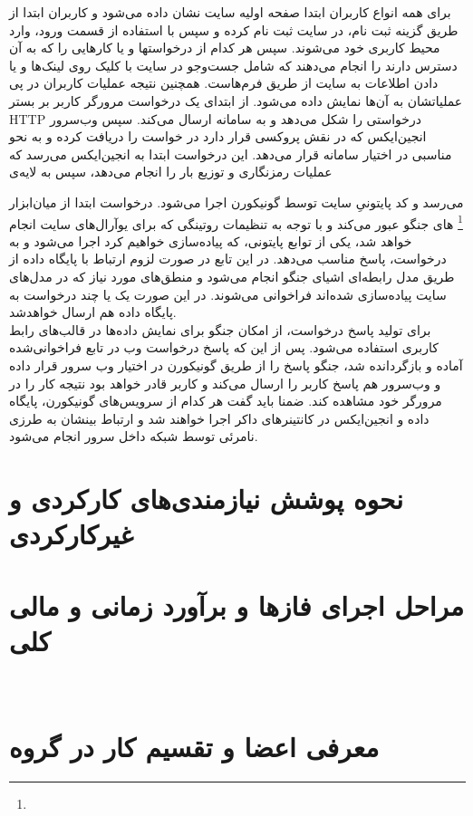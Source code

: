 \documentclass{article}
\begin{document}
برای همه انواع کاربران ابتدا صفحه اولیه سایت نشان داده‌ می‌شود و کاربران ابتدا از طریق گزینه ثبت نام، در سایت ثبت نام کرده و سپس با استفاده از قسمت ورود، وارد محیط کاربری خود می‌شوند. سپس  هر کدام از درخواستها و یا کارهایی را که به آن دسترس دارند را انجام می‌دهند که شامل جست‌و‌جو در سایت با کلیک روی لینک‌ها و یا دادن اطلاعات به سایت از طریق فرم‌هاست. همچنین نتیجه عملیات کاربران در پی عملیاتشان به آن‌ها نمایش داده‌ می‌شود. از ابتدای یک درخواست مرورگر کاربر بر بستر HTTP درخواستی را شکل می‌دهد و به سامانه ارسال می‌کند. سپس وب‌سرور انجین‌ایکس که در نقش پروکسی قرار دارد در خواست را دریافت کرده و به نحو مناسبی در اختیار سامانه  قرار می‌دهد. این درخواست ابتدا به انجین‌ایکس می‌رسد که عملیات رمزنگاری و توزیع بار را انجام می‌دهد، سپس به لایه‌ی { می‌رسد و کد پایتونیِ سایت توسط گونیکورن اجرا می‌شود. درخواست ابتدا از میان‌ابزار \footnote{} های جنگو عبور می‌کند و با توجه به تنظیمات روتینگی که برای یو‌آرال‌های سایت انجام خواهد شد، یکی از توابع پایتونی‌، که پیاده‌سازی خواهیم کرد اجرا می‌شود و به درخواست، پاسخ مناسب می‌دهد. در این تابع در صورت لزوم ارتباط با پایگاه داده از طریق مدل‌ رابطه‌ای اشیای جنگو انجام می‌شود و منطق‌های مورد نیاز که در مدل‌های سایت پیاده‌سازی شده‌اند فراخوانی می‌شوند. در این صورت یک یا چند درخواست به پایگاه داده ‌هم ارسال خواهدشد. \\
برای تولید پاسخ درخواست، از امکان جنگو برای نمایش داده‌ها در قالب‌های رابط کاربری استفاده می‌شود. پس از این که پاسخ درخواست وب در تابع فراخوانی‌شده آماده و بازگردانده شد، جنگو پاسخ را از طریق گونیکورن در اختیار وب سرور قرار داده و وب‌سرور هم پاسخ کاربر را ارسال می‌کند و کاربر قادر خواهد بود نتیجه کار را در مرورگر خود مشاهده کند. ضمنا باید گفت هر کدام از سرویس‌های گونیکورن، پایگاه داده و انجین‌ایکس در کانتینرهای داکر اجرا‌ خواهند شد و ارتباط بینشان به طرزی نامرئی توسط شبکه داخل سرور انجام می‌شود.


\section{نحوه پوشش نیازمندی‌های کارکردی و غیرکارکردی}

\newpage
\section{مراحل اجرای فازها و برآورد زمانی و مالی کلی}
‌
\section{معرفی اعضا و تقسیم کار در گروه}
}
\end{document}
